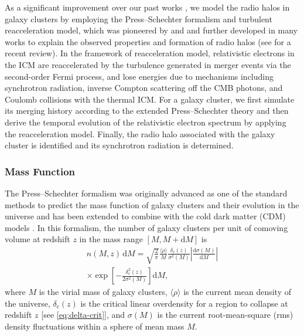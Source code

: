 \documentclass[twocolumn]{aastex62}
\newcommand{\R}[1]{\mathrm{#1}}
\newcommand{\D}[1]{\R{d} #1}
\newcommand{\diff}[2]{\frac{\D{#1}}{\D{#2}}}
\begin{document}
As a significant improvement over our past works \citep{wang2010,wang2013},
we model the radio halos in galaxy clusters by employing the
Press--Schechter formalism and turbulent reacceleration model,
which was pioneered by \citet{brunetti2001} and \citet{petrosian2001}
and further developed in many works
\citep[e.g.,][]{fujita2003,brunetti2004,cassano2005,brunetti2007,brunetti2011}
to explain the observed properties and formation of radio halos
(see \citealt{brunetti2014rev} for a recent review).
In the framework of reacceleration model, relativistic electrons in the
ICM are reaccelerated by the turbulence generated in merger events via the
second-order Fermi process, and lose energies due to mechanisms including
synchrotron radiation, inverse Compton scattering off the CMB photons, and
Coulomb collisions with the thermal ICM.
For a galaxy cluster, we first simulate its merging history according to
the extended Press--Schechter theory and then derive the temporal evolution
of the relativistic electron spectrum by applying the reacceleration
model.
Finally, the radio halo associated with the galaxy cluster is identified
and its synchrotron radiation is determined.

\subsubsection{Mass Function}
\label{sec:mass-function}

The Press--Schechter formalism was originally advanced as one of the standard
methods to predict the mass function of galaxy clusters and their evolution
in the universe \citep{press1974} and has been extended to combine with
the cold dark matter (CDM) models \citep[e.g.,][]{bond1991,lacey1993}.
In this formalism, the number of galaxy clusters per unit of comoving volume
at redshift $z$ in the mass range $[M, M + \R{d}M]$ is
\begin{multline}
  \label{eq:ps-mass-func}
  n(M, z) \,\D{M} = \sqrt{\frac{2}{\pi}} \frac{\langle{\rho}\rangle}{M}
  \frac{\delta_c(z)}{\sigma^2(M)} \left| \diff{\sigma(M)}{M} \right| \\
  \times \exp\!\left[ -\frac{\delta_c^2(z)}{2\sigma^2(M)} \right] \D{M},
\end{multline}
where $M$ is the virial mass of galaxy clusters,
$\langle {\rho} \rangle$ is the current mean density of the universe,
$\delta_c(z)$ is the critical linear overdensity for a region to collapse
at redshift $z$ [see \autoref{eq:delta-crit}],
and $\sigma(M)$ is the current root-mean-square (rms) density
fluctuations within a sphere of mean mass $M$.
\end{document}
